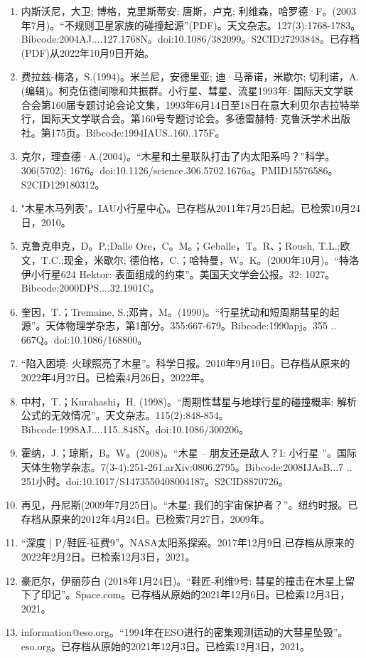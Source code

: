 \begin{enumerate}
\item 内斯沃尼，大卫; 博格，克里斯蒂安; 唐斯，卢克; 利维森，哈罗德·F。(2003年7月)。“不规则卫星家族的碰撞起源”(PDF)。天文杂志。127(3):1768-1783。Bibcode:2004AJ....127.1768N。doi:10.1086/382099。S2CID27293848。已存档(PDF)从2022年10月9日开始。  
\item 费拉兹-梅洛，S.(1994)。米兰尼，安德里亚; 迪·马蒂诺，米歇尔; 切利诺，A. (编辑)。柯克伍德间隙和共振群。小行星、彗星、流星1993年: 国际天文学联合会第160届专题讨论会论文集，1993年6月14日至18日在意大利贝尔吉拉特举行，国际天文学联合会。第160号专题讨论会。多德雷赫特: 克鲁沃学术出版社。第175页。Bibcode:1994IAUS..160..175F。
\item 克尔，理查德·A.(2004)。“木星和土星联队打击了内太阳系吗？”科学。306(5702): 1676。doi:10.1126/science.306.5702.1676a。PMID15576586。S2CID129180312。  
\item "木星木马列表"。IAU小行星中心。已存档从2011年7月25日起。已检索10月24日，2010。
\item 克鲁克申克，D。P.;Dalle Ore，C。M。；Geballe，T。R、；Roush, T.L.;欧文，T.C.;现金，米歇尔; 德伯格，C.；哈特曼，W。K。(2000年10月)。“特洛伊小行星624 Hektor: 表面组成的约束”。美国天文学会公报。32: 1027。Bibcode:2000DPS....32.1901C。
\item 奎因，T.；Tremaine, S.;邓肯，M。(1990)。“行星扰动和短周期彗星的起源”。天体物理学杂志，第1部分。355:667-679。Bibcode:1990apj。355 .. 667Q。doi:10.1086/168800。
\item “陷入困境: 火球照亮了木星”。科学日报。2010年9月10日。已存档从原来的2022年4月27日。已检索4月26日，2022年。
\item 中村，T.；Kurahashi，H. (1998)。“周期性彗星与地球行星的碰撞概率: 解析公式的无效情况”。天文杂志。115(2):848-854。Bibcode:1998AJ....115..848N。doi:10.1086/300206。
\item 霍纳，J.；琼斯，B。W。(2008)。“木星 -- 朋友还是敌人？I: 小行星 ”。国际天体生物学杂志。7(3-4):251-261.arXiv:0806.2795。Bibcode:2008IJAsB...7 .. 251小时。doi:10.1017/S1473550408004187。S2CID8870726。 
\item 再见，丹尼斯(2009年7月25日)。“木星: 我们的宇宙保护者？”。纽约时报。已存档从原来的2012年4月24日。已检索7月27日，2009年。
\item “深度 | P/鞋匠-征费9”。NASA太阳系探索。2017年12月9日.已存档从原来的2022年2月2日。已检索12月3日，2021。
\item 豪厄尔，伊丽莎白 (2018年1月24日)。“鞋匠-利维9号: 彗星的撞击在木星上留下了印记”。Space.com。已存档从原始的2021年12月6日。已检索12月3日，2021。
\item information@eso.org。“1994年在ESO进行的密集观测运动的大彗星坠毁”。eso.org。已存档从原始的2021年12月3日。已检索12月3日，2021。

\end{enumerate}
